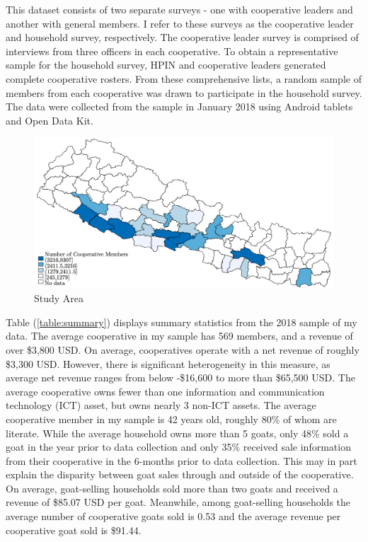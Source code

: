 \documentclass[11pt]{article}
\begin{document}
This dataset consists of two separate surveys - one with cooperative leaders and another with general members.
I refer to these surveys as the cooperative leader and household survey, respectively. The cooperative leader survey is comprised of interviews from three officers in each cooperative. To obtain a representative sample for the household survey, HPIN and cooperative leaders generated complete cooperative rosters. From these comprehensive lists, a random sample of members from each cooperative was drawn to participate in the household survey. The data were collected from the sample in January 2018 using Android tablets and Open Data Kit.

\begin{figure}[!h]
    \caption{Study Area}
    \label{map}
    \noindent \centering \includegraphics[width=.9\textwidth,trim=4 4 4 4,clip]{StudyMap.png}
\end{figure}

Table (\ref{table:summary}) displays summary statistics from the 2018 sample of my data. The average cooperative in my sample has 569 members, and a revenue of over \$3,800 USD. On average, cooperatives operate with a net revenue of roughly \$3,300 USD. However, there is significant heterogeneity in this measure, as average net revenue ranges from below -\$16,600 to more than \$65,500 USD. The average cooperative owns fewer than one information and communication technology (ICT) asset, but owns nearly 3 non-ICT assets. The average cooperative member in my sample is 42 years old, roughly 80\% of whom are literate. While the average household owns more than 5 goats, only 48\% sold a goat in the year prior to data collection and only 35\% received sale information from their cooperative in the 6-months prior to data collection. This may in part explain the disparity between goat sales through and outside of the cooperative. On average, goat-selling households sold more than two goats and received a revenue of \$85.07 USD per goat. Meanwhile, among goat-selling households the average number of cooperative goats sold is 0.53 and the average revenue per cooperative goat sold is \$91.44.
\end{document}
